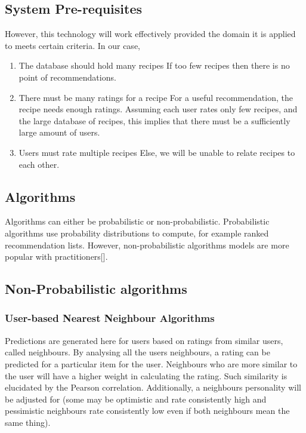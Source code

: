 \subsection{System Pre-requisites}

However, this technology will work effectively provided the domain it is applied to meets certain criteria. In our case, 

\begin{enumerate}
\item	The database should hold many recipes 
If too few recipes then there is no point of recommendations.

\item	There must be many ratings for a recipe
For a useful recommendation, the recipe needs enough ratings. Assuming each user rates only few recipes, and the large database of recipes, this implies that there must be a sufficiently large amount of users.

\item	Users must rate multiple recipes
Else, we will be unable to relate recipes to each other.

\end{enumerate}

\subsection{Algorithms}

Algorithms can either be probabilistic or non-probabilistic. Probabilistic algorithms use probability distributions to compute, for example ranked recommendation lists. However, non-probabilistic algorithms models are more popular with practitioners[]. 

\subsection{Non-Probabilistic algorithms}

\subsubsection{User-based Nearest Neighbour Algorithms}

Predictions are generated here for users based on ratings from similar users, called neighbours. By analysing all the users neighbours, a rating can be predicted for a particular item for the user. Neighbours who are more similar to the user will have a higher weight in calculating the rating. Such similarity is elucidated by the Pearson correlation. Additionally, a neighbours personality will be adjusted for (some may be optimistic and rate consistently high and pessimistic neighbours rate consistently low even if both neighbours mean the same thing). 

